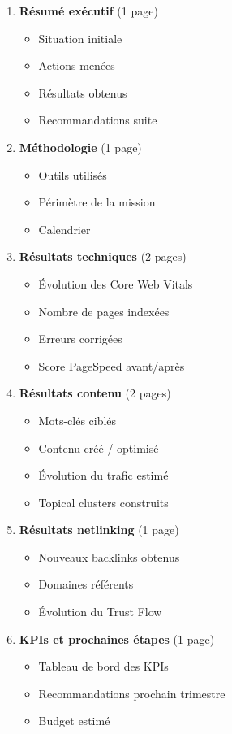 \documentclass[12pt,a4paper]{report}
\begin{document}
\begin{enumerate}
\item \textbf{Résumé exécutif} (1 page)
   \begin{itemize}
   \item Situation initiale
   \item Actions menées
   \item Résultats obtenus
   \item Recommandations suite
   \end{itemize}

\item \textbf{Méthodologie} (1 page)
   \begin{itemize}
   \item Outils utilisés
   \item Périmètre de la mission
   \item Calendrier
   \end{itemize}

\item \textbf{Résultats techniques} (2 pages)
   \begin{itemize}
   \item Évolution des Core Web Vitals
   \item Nombre de pages indexées
   \item Erreurs corrigées
   \item Score PageSpeed avant/après
   \end{itemize}

\item \textbf{Résultats contenu} (2 pages)
   \begin{itemize}
   \item Mots-clés ciblés
   \item Contenu créé / optimisé
   \item Évolution du trafic estimé
   \item Topical clusters construits
   \end{itemize}

\item \textbf{Résultats netlinking} (1 page)
   \begin{itemize}
   \item Nouveaux backlinks obtenus
   \item Domaines référents
   \item Évolution du Trust Flow
   \end{itemize}

\item \textbf{KPIs et prochaines étapes} (1 page)
   \begin{itemize}
   \item Tableau de bord des KPIs
   \item Recommandations prochain trimestre
   \item Budget estimé
   \end{itemize}
\end{enumerate}
\end{document}
